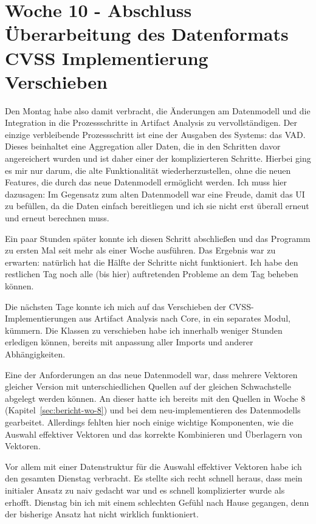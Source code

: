 \section{Woche 10 - Abschluss Überarbeitung des Datenformats \headerand CVSS Implementierung Verschieben} \label{sec:bericht-wo-10}



Den Montag habe also damit verbracht, die Änderungen am Datenmodell und die Integration in die Prozessschritte in Artifact Analysis zu vervollständigen.
Der einzige verbleibende Prozessschritt ist eine der Ausgaben des Systems: das VAD\@.
Dieses beinhaltet eine Aggregation aller Daten, die in den Schritten davor angereichert wurden und ist daher einer der komplizierteren Schritte.
Hierbei ging es mir nur darum, die alte Funktionalität wiederherzustellen, ohne die neuen Features, die durch das neue Datenmodell ermöglicht werden.
Ich muss hier dazusagen: Im Gegensatz zum alten Datenmodell war eine Freude, damit das UI zu befüllen, da die Daten einfach bereitliegen und ich sie nicht erst überall erneut und erneut berechnen muss.

Ein paar Stunden später konnte ich diesen Schritt abschließen und das Programm zu ersten Mal seit mehr als einer Woche ausführen.
Das Ergebnis war zu erwarten: natürlich hat die Hälfte der Schritte nicht funktioniert.
Ich habe den restlichen Tag noch alle (bis hier) auftretenden Probleme an dem Tag beheben können.


Die nächsten Tage konnte ich mich auf das Verschieben der CVSS-Implementierungen aus Artifact Analysis nach Core, in ein separates Modul, kümmern.
Die Klassen zu verschieben habe ich innerhalb weniger Stunden erledigen können, bereits mit anpassung aller Imports und anderer Abhängigkeiten.

Eine der Anforderungen an das neue Datenmodell war, dass mehrere Vektoren gleicher Version mit unterschiedlichen Quellen auf der gleichen Schwachstelle abgelegt werden können.
An dieser hatte ich bereits mit den Quellen in Woche 8 (Kapitel\ \ref{sec:bericht-wo-8}) und bei dem neu-implementieren des Datenmodells gearbeitet.
Allerdings fehlten hier noch einige wichtige Komponenten, wie die Auswahl effektiver Vektoren und das korrekte Kombinieren und Überlagern von Vektoren.

Vor allem mit einer Datenstruktur für die Auswahl effektiver Vektoren habe ich den gesamten Dienstag verbracht.
Es stellte sich recht schnell heraus, dass mein initialer Ansatz zu naiv gedacht war und es schnell komplizierter wurde als erhofft.
Dienstag bin ich mit einem schlechten Gefühl nach Hause gegangen, denn der bisherige Ansatz hat nicht wirklich funktioniert.

